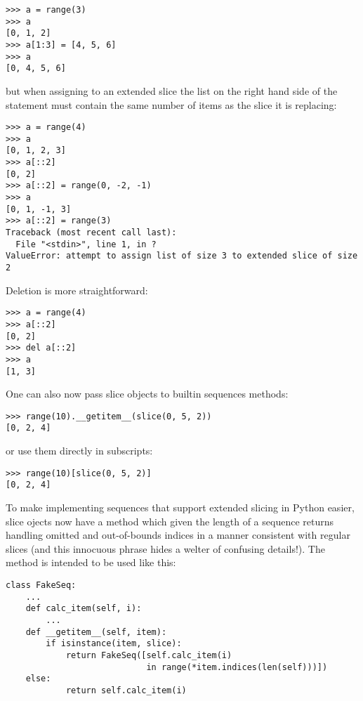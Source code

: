 \documentclass{howto}
\begin{document}
\begin{verbatim}
>>> a = range(3)
>>> a
[0, 1, 2]
>>> a[1:3] = [4, 5, 6]
>>> a
[0, 4, 5, 6]
\end{verbatim}

but when assigning to an extended slice the list on the right hand
side of the statement must contain the same number of items as the
slice it is replacing:

\begin{verbatim}
>>> a = range(4)
>>> a
[0, 1, 2, 3]
>>> a[::2]
[0, 2]
>>> a[::2] = range(0, -2, -1)
>>> a
[0, 1, -1, 3]
>>> a[::2] = range(3)
Traceback (most recent call last):
  File "<stdin>", line 1, in ?
ValueError: attempt to assign list of size 3 to extended slice of size 2
\end{verbatim}

Deletion is more straightforward:

\begin{verbatim}
>>> a = range(4)
>>> a[::2]
[0, 2]
>>> del a[::2]
>>> a
[1, 3]
\end{verbatim}

One can also now pass slice objects to builtin sequences
 methods:

\begin{verbatim}
>>> range(10).__getitem__(slice(0, 5, 2))
[0, 2, 4]
\end{verbatim}

or use them directly in subscripts:

\begin{verbatim}
>>> range(10)[slice(0, 5, 2)]
[0, 2, 4]
\end{verbatim}

To make implementing sequences that support extended slicing in Python
easier, slice ojects now have a method  which given
the length of a sequence returns  handling
omitted and out-of-bounds indices in a manner consistent with regular
slices (and this innocuous phrase hides a welter of confusing
details!).  The method is intended to be used like this:

\begin{verbatim}
class FakeSeq:
    ...
    def calc_item(self, i):
        ...
    def __getitem__(self, item):
        if isinstance(item, slice):
            return FakeSeq([self.calc_item(i) 
                            in range(*item.indices(len(self)))])
	else:
            return self.calc_item(i)
\end{verbatim}
\end{document}
